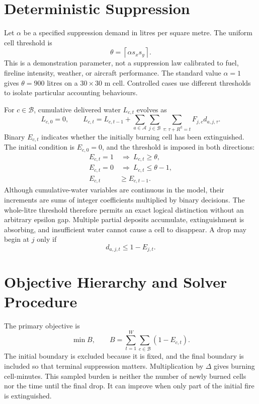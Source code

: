 \section{Deterministic Suppression}
\label{sec:method-suppression}

Let $\alpha$ be a specified suppression demand in litres per square metre. The uniform cell threshold is
\begin{equation}
    \theta=\left\lceil\alpha s_xs_y\right\rceil.
\end{equation}
This is a demonstration parameter, not a suppression law calibrated to fuel, fireline intensity, weather, or aircraft performance. The standard value $\alpha=1$ gives $\theta=900$ litres on a $30\times30$ m cell. Controlled cases use different thresholds to isolate particular accounting behaviours.

For $c\in\mathcal{B}$, cumulative delivered water $L_{c,t}$ evolves as
\begin{equation}
    L_{c,0}=0,
    \qquad
    L_{c,t}=L_{c,t-1}
    +\sum_{a\in\mathcal{A}}\sum_{j\in\mathcal{B}}
    \sum_{\tau:\,\tau+R^{\mathrm{d}}=t}F_{j,c}d_{a,j,\tau}.
\end{equation}
Binary $E_{c,t}$ indicates whether the initially burning cell has been extinguished. The initial condition is $E_{c,0}=0$, and the threshold is imposed in both directions:
\begin{align}
    E_{c,t}=1&\ \Longrightarrow\ L_{c,t}\geq\theta,\\
    E_{c,t}=0&\ \Longrightarrow\ L_{c,t}\leq\theta-1,\\
    E_{c,t}&\geq E_{c,t-1}.
\end{align}
Although cumulative-water variables are continuous in the model, their increments are sums of integer coefficients multiplied by binary decisions. The whole-litre threshold therefore permits an exact logical distinction without an arbitrary epsilon gap. Multiple partial deposits accumulate, extinguishment is absorbing, and insufficient water cannot cause a cell to disappear. A drop may begin at $j$ only if
\begin{equation}
    d_{a,j,t}\leq1-E_{j,t}.
\end{equation}

\section{Objective Hierarchy and Solver Procedure}
\label{sec:method-solver}

The primary objective is
\begin{equation}
    \min B,
    \qquad B=\sum_{t=1}^{W}\sum_{c\in\mathcal{B}}(1-E_{c,t}).
    \label{eq:static-primary}
\end{equation}
The initial boundary is excluded because it is fixed, and the final boundary is included so that terminal suppression matters. Multiplication by $\Delta$ gives burning cell-minutes. This sampled burden is neither the number of newly burned cells nor the time until the final drop. It can improve when only part of the initial fire is extinguished.

